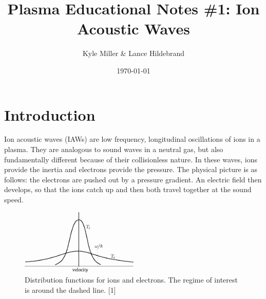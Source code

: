 \documentclass[12pt]{article}
\begin{document}
\title{\vspace{-5ex}Plasma Educational Notes \#1: Ion Acoustic Waves\vspace{-1ex}}
\date{\vspace{-1ex}\today}
\author{Kyle Miller \& Lance Hildebrand}
\maketitle

\section*{Introduction}
Ion acoustic waves (IAWs) are low frequency, longitudinal oscillations of ions in a plasma. They are analogous to sound waves in a neutral gas, but also fundamentally different because of their collisionless nature. In these waves, ions provide the inertia and electrons provide the pressure. The physical picture is as follows: the electrons are pushed out by a pressure gradient. An electric field then develops, so that the ions catch up and then both travel together at the sound speed.

\begin{figure}[H]
	\centering
	\includegraphics[width=0.5\textwidth]{IAW_dfs}
	\caption{Distribution functions for ions and electrons. The regime of interest is around the dashed line. [1]}
\end{figure}
\end{document}
